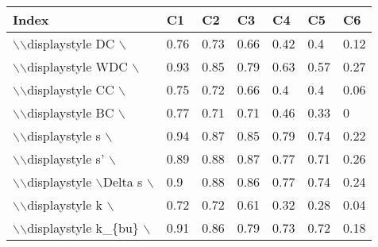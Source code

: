 \begin{table}[ht]
\centering
\begin{tabular}{lllllll}
  \hline
Index & C1 & C2 & C3 & C4 & C5 & C6 \\ 
  \hline
$\backslash$$\backslash$displaystyle DC $\backslash$}$\backslash$$\backslash$ & {\color[HTML]{00D768} 0.76} & {\color[HTML]{EF2A00} 0.73} & {\color[HTML]{0051D7} 0.66} & {\color[HTML]{6200D7} 0.42} & {\color{orange} 0.4} & {\color[HTML]{9B9B9B} 0.12} \\ 
  $\backslash$$\backslash$displaystyle WDC $\backslash$} & {\color[HTML]{EF2A00} 0.93} & {\color[HTML]{00D768} 0.85} & {\color[HTML]{0051D7} 0.79} & {\color{orange} 0.63} & {\color[HTML]{6200D7} 0.57} & {\color[HTML]{9B9B9B} 0.27} \\ 
  $\backslash$$\backslash$displaystyle CC $\backslash$} & {\color[HTML]{00D768} 0.75} & {\color[HTML]{EF2A00} 0.72} & {\color[HTML]{0051D7} 0.66} & {\color[HTML]{6200D7} 0.4} & {\color{orange} 0.4} & {\color[HTML]{9B9B9B} 0.06} \\ 
  $\backslash$$\backslash$displaystyle BC $\backslash$} & {\color[HTML]{00D768} 0.77} & {\color[HTML]{0051D7} 0.71} & {\color[HTML]{EF2A00} 0.71} & {\color{orange} 0.46} & {\color[HTML]{6200D7} 0.33} & {\color[HTML]{9B9B9B} 0} \\ 
  $\backslash$$\backslash$displaystyle s $\backslash$} & {\color[HTML]{00D768} 0.94} & {\color[HTML]{EF2A00} 0.87} & {\color[HTML]{0051D7} 0.85} & {\color{orange} 0.79} & {\color[HTML]{6200D7} 0.74} & {\color[HTML]{9B9B9B} 0.22} \\ 
  $\backslash$$\backslash$displaystyle s' $\backslash$} & {\color[HTML]{EF2A00} 0.89} & {\color[HTML]{0051D7} 0.88} & {\color[HTML]{00D768} 0.87} & {\color[HTML]{6200D7} 0.77} & {\color{orange} 0.71} & {\color[HTML]{9B9B9B} 0.26} \\ 
  $\backslash$$\backslash$displaystyle $\backslash$Delta s $\backslash$} & {\color[HTML]{00D768} 0.9} & {\color[HTML]{EF2A00} 0.88} & {\color[HTML]{0051D7} 0.86} & {\color[HTML]{6200D7} 0.77} & {\color{orange} 0.74} & {\color[HTML]{9B9B9B} 0.24} \\ 
  $\backslash$$\backslash$displaystyle k $\backslash$} & {\color[HTML]{00D768} 0.72} & {\color[HTML]{EF2A00} 0.72} & {\color[HTML]{0051D7} 0.61} & {\color[HTML]{6200D7} 0.32} & {\color{orange} 0.28} & {\color[HTML]{9B9B9B} 0.04} \\ 
  $\backslash$$\backslash$displaystyle k\_\{bu\} $\backslash$} & {\color[HTML]{00D768} 0.91} & {\color[HTML]{EF2A00} 0.86} & {\color[HTML]{0051D7} 0.79} & {\color[HTML]{6200D7} 0.73} & {\color{orange} 0.72} & {\color[HTML]{9B9B9B} 0.18} \\ 

\end{tabular}
\end{table}
